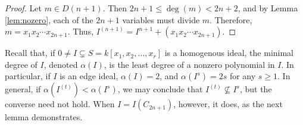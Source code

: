 \documentclass[12pt]{amsart}
\renewcommand{\geq}{\geqslant}
\renewcommand{\ge}{\geqslant}
\renewcommand{\le}{\leqslant}
\theoremstyle{plain}
\theoremstyle{definition}
\begin{document}
\begin{proof}
	Let $m\in D(n+1)$.
	Then $2n+1 \le \deg(m) < 2n+2$, and by Lemma \ref{lem:nozero}, each of the $2n+1$ variables must divide $m$.
	Therefore, $m = x_1 x_2 \cdots x_{2n+1}$.
%	
%	
%	
	Thus, $I^{(n+1)} = I^{n+1} + (x_1x_2\cdots x_{2n+1})$.
\end{proof}




Recall that, if $0\ne I\subsetneq S = k[x_1,x_2,\ldots,x_r]$ is a homogenous ideal, the minimal degree of $I$, denoted $\alpha(I)$, is the least degree of a nonzero polynomial in $I$.
In particular, if $I$ is an edge ideal, $\alpha(I) = 2$, and $\alpha(I^s) = 2s$ for any $s \ge 1$.
In general, if $\alpha(I^{(t)}) < \alpha(I^s)$, we may conclude that $I^{(t)}\not\subseteq I^s$, but the converse need not hold.
When $I = I(C_{2n+1})$, however, it does, as the next lemma demonstrates.
\end{document}
